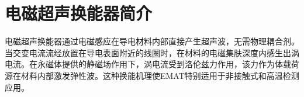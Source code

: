\thesistranslationchinese
\section{电磁超声换能器简介}

电磁超声换能器通过电磁感应在导电材料内部直接产生超声波，无需物理耦合剂。当交变电流流经放置在导电表面附近的线圈时，在材料的电磁集肤深度内感生出涡电流。在永磁体提供的静磁场作用下，涡电流受到洛伦兹力作用，该力作为体载荷源在材料内部激发弹性波。这种换能机理使EMAT特别适用于非接触式和高温检测应用。